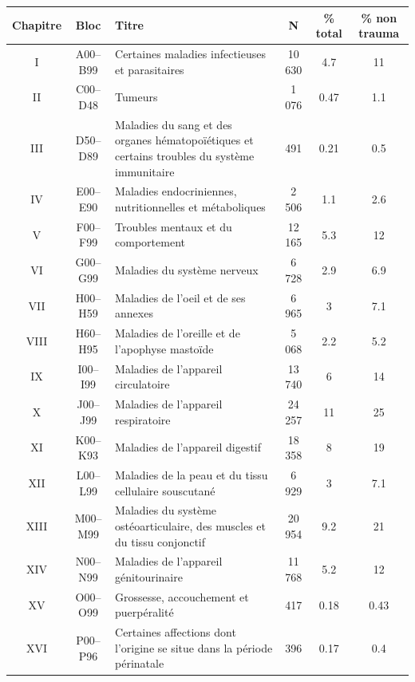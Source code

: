 \documentclass[12pt,english,french,twoside]{book}\usepackage[]{graphicx}\usepackage[]{color}
\begin{document}
\begin{longtable}{|c|c|m{4cm}|c|c|c|}
 \hline
 Chapitre & Bloc & Titre & N & \% total  & \% non trauma \\
 \hline
 
I & A00–B99 & Certaines maladies infectieuses et parasitaires & 10 630 & 4.7 & 11 \\
 II&C00–D48&Tumeurs&1 076&0.47&1.1\\
 
III&D50–D89&Maladies du sang et des organes hématopoïétiques et certains troubles du système immunitaire&491&0.21&0.5\\

IV&E00–E90&Maladies endocriniennes, nutritionnelles et métaboliques&2 506&1.1&2.6\\

V&F00–F99&Troubles mentaux et du comportement&12 165&5.3&12\\

VI&G00–G99&Maladies du système nerveux&6 728&2.9&6.9\\

VII & H00–H59 & Maladies de l'oeil et de ses annexes & 6 965 & 3&7.1\\

VIII&H60–H95&Maladies de l'oreille et de l'apophyse mastoïde&5 068&2.2&5.2\\

IX&I00–I99&Maladies de l'appareil circulatoire&13 740&6&14\\

X&J00–J99&Maladies de l'appareil respiratoire&24 257&11&25\\

XI&K00–K93&Maladies de l'appareil digestif&18 358&8&19\\

XII&L00–L99&Maladies de la peau et du tissu cellulaire souscutané&6 929&3&7.1\\

XIII&M00–M99&Maladies du système ostéoarticulaire, des muscles et du tissu conjonctif&20 954&9.2&21\\

XIV&N00–N99&Maladies de l'appareil génitourinaire&11 768&5.2&12\\

XV&O00–O99&Grossesse, accouchement et puerpéralité&417&0.18&0.43\\

XVI&P00–P96&Certaines affections dont l'origine se situe dans la période périnatale&396&0.17&0.4\\


\end{longtable}
\end{document}
